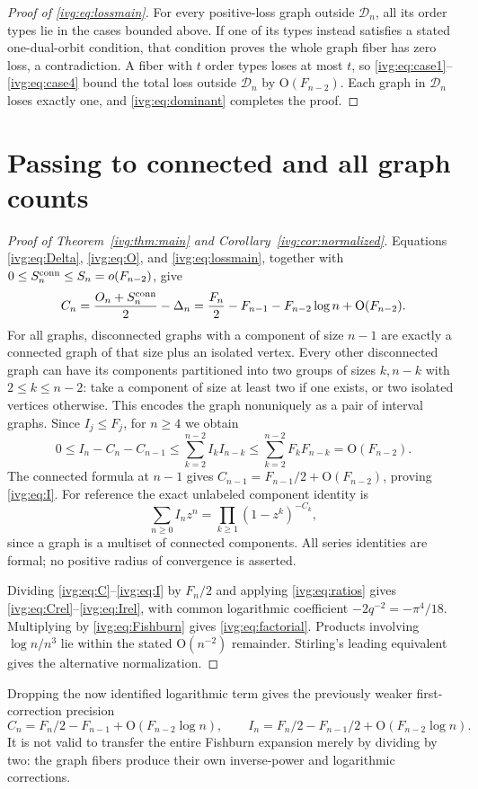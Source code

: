 \documentclass[11pt,letterpaper]{article}
\theoremstyle{definition}\newtheorem{definition}[theorem]{Definition}
\theoremstyle{remark}\newtheorem{remark}[theorem]{Remark}
\newcommand{\OO}{\mathrm O}
\begin{document}
\begin{proof}[Proof of \eqref{ivg:eq:lossmain}]
For every positive-loss graph outside $\mathcal D_n$, all its order types lie in the cases bounded above. If one of its types instead satisfies a stated one-dual-orbit condition, that condition proves the whole graph fiber has zero loss, a contradiction. A fiber with $t$ order types loses at most $t$, so \eqref{ivg:eq:case1}--\eqref{ivg:eq:case4} bound the total loss outside $\mathcal D_n$ by $\OO(F_{n-2})$. Each graph in $\mathcal D_n$ loses exactly one, and \eqref{ivg:eq:dominant} completes the proof.
\end{proof}

\section{Passing to connected and all graph counts}\label{ivg:sec:finish}
\begin{proof}[Proof of Theorem~\ref{ivg:thm:main} and Corollary~\ref{ivg:cor:normalized}]
Equations \eqref{ivg:eq:Delta}, \eqref{ivg:eq:O}, and \eqref{ivg:eq:lossmain}, together with $0\le S_n^{\rm conn}\le S_n=o(F_{n-2})$, give
\[
 C_n=\frac{O_n+S_n^{\rm conn}}2-\Delta_n
 =\frac{F_n}2-F_{n-1}-F_{n-2}\log n+\OO(F_{n-2}).
\]
For all graphs, disconnected graphs with a component of size $n-1$ are exactly a connected graph of that size plus an isolated vertex. Every other disconnected graph can have its components partitioned into two groups of sizes $k,n-k$ with $2\le k\le n-2$: take a component of size at least two if one exists, or two isolated vertices otherwise. This encodes the graph nonuniquely as a pair of interval graphs. Since $I_j\le F_j$, for $n\ge4$ we obtain
\[
 0\le I_n-C_n-C_{n-1}
 \le\sum_{k=2}^{n-2}I_kI_{n-k}
 \le\sum_{k=2}^{n-2}F_kF_{n-k}=\OO(F_{n-2}).
\]
The connected formula at $n-1$ gives $C_{n-1}=F_{n-1}/2+\OO(F_{n-2})$, proving \eqref{ivg:eq:I}. For reference the exact unlabeled component identity is
\begin{equation}\label{ivg:eq:Euler}
 \sum_{n\ge0}I_nz^n=\prod_{k\ge1}(1-z^k)^{-C_k},
\end{equation}
since a graph is a multiset of connected components. All series identities are formal; no positive radius of convergence is asserted.

Dividing \eqref{ivg:eq:C}--\eqref{ivg:eq:I} by $F_n/2$ and applying \eqref{ivg:eq:ratios} gives \eqref{ivg:eq:Crel}--\eqref{ivg:eq:Irel}, with common logarithmic coefficient $-2q^{-2}=-\pi^4/18$. Multiplying by \eqref{ivg:eq:Fishburn} gives \eqref{ivg:eq:factorial}. Products involving $\log n/n^3$ lie within the stated $\OO(n^{-2})$ remainder. Stirling's leading equivalent gives the alternative normalization.
\end{proof}
Dropping the now identified logarithmic term gives the previously weaker first-correction precision
\[
 C_n=F_n/2-F_{n-1}+\OO(F_{n-2}\log n),\qquad
 I_n=F_n/2-F_{n-1}/2+\OO(F_{n-2}\log n).
\]
It is not valid to transfer the entire Fishburn expansion merely by dividing by two: the graph fibers produce their own inverse-power and logarithmic corrections.
\end{document}
